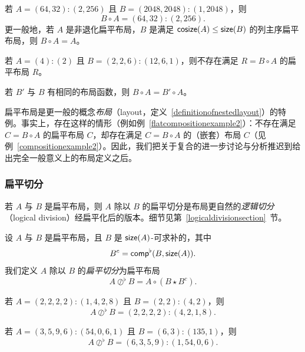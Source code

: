 \begin{example}
    若 $A = (64,32):(2,256)$ 且 $B = (2048,2048):(1,2048)$，则
    \[
    B \circ A = (64,32):(2,256).
    \]
    更一般地，若 $A$ 是非退化扁平布局，$B$ 是满足 $\mathsf{cosize}(A) \leq \mathsf{size}(B)$ 的列主序扁平布局，则 $B \circ A = A$。
\end{example}

\begin{example}\label{flatcompositionexample2}
    若 $A = (4):(2)$ 且 $B = (2,2,6):(12,6,1)$，则不存在满足 $R = B \circ A$ 的扁平布局 $R$。
\end{example}

\begin{remark}
    若 $B'$ 与 $B$ 有相同的布局函数，则 $B \circ A = B' \circ A$。
\end{remark}

\begin{remark} 扁平布局是更一般的概念{\it 布局}（layout，定义~\ref{definitionofnestedlayout}）的特例。事实上，存在这样的情形（例如例~\ref{flatcompositionexample2}）：不存在满足 $C = B \circ A$ 的扁平布局 $C$，却存在满足 $C = B \circ A$ 的（嵌套）布局 $C$（见例~\ref{compositionexample2}）。因此，我们把关于复合的进一步讨论与分析推迟到给出完全一般意义上的布局定义之后。
\end{remark}


\subsubsection{扁平切分}
若 $A$ 与 $B$ 是扁平布局，则 $A$ 除以 $B$ 的扁平切分是布局更自然的{\it 逻辑切分}（logical division）经扁平化后的版本。细节见第~\ref{logicaldivisionsection}~节。
\begin{definition}
设 $A$ 与 $B$ 是扁平布局，且 $B$ 是 $\mathsf{size}(A)$-可求补的，其中
\[
B^c = \mathsf{comp}^\flat(B,\mathsf{size}(A)).
\]
我们定义 $A$ 除以 $B$ 的{\it 扁平切分}为扁平布局
\[
A\oslash^\flat B = A \circ (B \star B^c).
\]
\end{definition}

\begin{example}
    若 $A = (2,2,2,2):(1,4,2,8)$ 且 $B = (2,2):(4,2)$，则
    \[
    A\oslash^\flat B = (2,2,2,2):(4,2,1,8).
    \]
\end{example}

\begin{example}
    若 $A = (3,5,9,6):(54,0,6,1)$ 且 $B = (6,3):(135,1)$，则
    \[
    A\oslash^\flat B = (6,3,5,9):(1,54,0,6).
    \]
\end{example}

